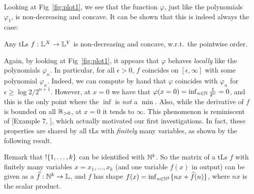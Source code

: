 % 

Looking at Fig~\ref{fig:plot1}, we see that the function $\varphi$, just like the polynomials $\varphi_{1}$, is non-decreasing and concave.
It can be shown that this is indeed always the case:

\begin{proposition}\label{prop:nondecr+conc}
 Any tLs $f:\mathbb{L}^X\to\mathbb{L}^Y$ is non-decreasing and concave, w.r.t.\ the pointwise order.
\end{proposition}

Again, by looking at Fig~\ref{fig:plot1}, it appears that $\varphi$ behaves \emph{locally} like the polynomials $\varphi_{n}$. In particular, for all $\epsilon >0$, $f$ coincides on $[\epsilon,\infty]$ with some polynomial $\varphi_{n}$. Indeed, we can compute  by hand that $\varphi$ coincides with $\varphi_{n}$ 
for $\epsilon \geq \log2/2^{n+1}$.
However, at
%
 $x=0$ we have that $\varphi(x=0)=\inf_{n\in\mathbb{N}} \frac{1}{2^n}=0$, and this is the only point where the $\inf$ is \emph{not} a $\min$.
Also, while the derivative of $f$ is bounded on all $\mathbb{R}_{>0}$, at $x=0$ it tends to $\infty$.
This phenomenon is reminiscent of [Example 7, \cite{Ehrhard2005}],
which actually motivated our first investigations.
In fact, these properties are shared by all tLs with \emph{finitely} many variables, as shown by the following result.


Remark that $!\{1,\dots,k\}$ can be identified with $\mathbb{N}^k$.
So the matrix of a tLs $f$ with finitely many variables $x=x_1,\dots,x_k$ (and one variable $f(x)$ in output) can be given as a $\widehat f:\mathbb{N}^k\to\mathbb{L}$, and $f$ has shape $f(x)=\inf_{n\in \mathbb{N}^k}\{nx+\widehat f(n)\}$, where $nx$ is the scalar product.

